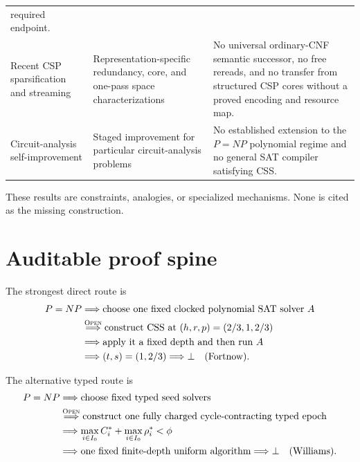 \documentclass[11pt]{article}
\newcommand{\Open}{\textsc{Open}}
\begin{document}
\begin{longtable}{L{0.22\textwidth}L{0.31\textwidth}L{0.39\textwidth}}
required endpoint. \\
Recent CSP sparsification and streaming & Representation-specific redundancy,
core, and one-pass space characterizations
\cite{brakensiekguruswami2026,sharmavelusamy2026,brakensiekputterman2026} &
No universal ordinary-CNF semantic successor, no free rereads, and no
transfer from structured CSP cores without a proved encoding and resource
map. \\
Circuit-analysis self-improvement & Staged improvement for particular
circuit-analysis problems \cite{williams2024} & No established extension to
the $P=NP$ polynomial regime and no general SAT compiler satisfying CSS. \\
\end{longtable}

These results are constraints, analogies, or specialized mechanisms.  None
is cited as the missing construction.

\section{Auditable proof spine}

The strongest direct route is
\begin{equation}
\begin{aligned}
 P=NP
 &\Longrightarrow \text{choose one fixed clocked polynomial SAT solver }A\\
 &\mathrel{\mathop{\Longrightarrow}^{\Open}}
       \text{construct CSS at }(h,r,p)=(2/3,1,2/3)\\
 &\Longrightarrow \text{apply it a fixed depth and then run }A\\
 &\Longrightarrow (t,s)=(1,2/3)
 \Longrightarrow \bot\quad\text{(Fortnow).}
\end{aligned}
\label{eq:direct-spine}
\end{equation}

The alternative typed route is
\begin{equation}
\begin{aligned}
 P=NP
 &\Longrightarrow \text{choose fixed typed seed solvers}\\
 &\mathrel{\mathop{\Longrightarrow}^{\Open}}
       \text{construct one fully charged cycle-contracting typed epoch}\\
 &\Longrightarrow
       \max_{i\in I_0}C_i^*+\max_{i\in I_0}\rho_i^*<\phi\\
 &\Longrightarrow \text{one fixed finite-depth uniform algorithm}
 \Longrightarrow \bot\quad\text{(Williams).}
\end{aligned}
\label{eq:typed-spine}
\end{equation}
\end{document}
